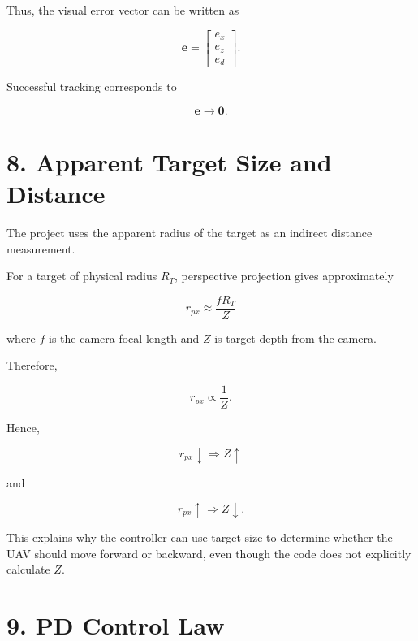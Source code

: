 \documentclass[12pt,a4paper]{article}
\begin{document}
Thus, the visual error vector can be written as

\begin{equation}
\boxed{
\mathbf{e}=
\begin{bmatrix}
e_x\\e_z\\e_d
\end{bmatrix}.
}
\end{equation}

Successful tracking corresponds to

\begin{equation}
\boxed{
\mathbf{e}\rightarrow\mathbf{0}.
}
\end{equation}

\section{8. Apparent Target Size and Distance}

The project uses the apparent radius of the target as an indirect distance measurement.

For a target of physical radius $R_T$, perspective projection gives approximately

\begin{equation}
\boxed{
r_{px}\approx\frac{fR_T}{Z}
}
\end{equation}

where $f$ is the camera focal length and $Z$ is target depth from the camera.

Therefore,

\begin{equation}
r_{px}\propto\frac{1}{Z}.
\end{equation}

Hence,

\begin{equation}
r_{px}\downarrow\Rightarrow Z\uparrow
\end{equation}

and

\begin{equation}
r_{px}\uparrow\Rightarrow Z\downarrow.
\end{equation}

This explains why the controller can use target size to determine whether the UAV should move forward or backward, even though the code does not explicitly calculate $Z$.

\section{9. PD Control Law}
\end{document}
